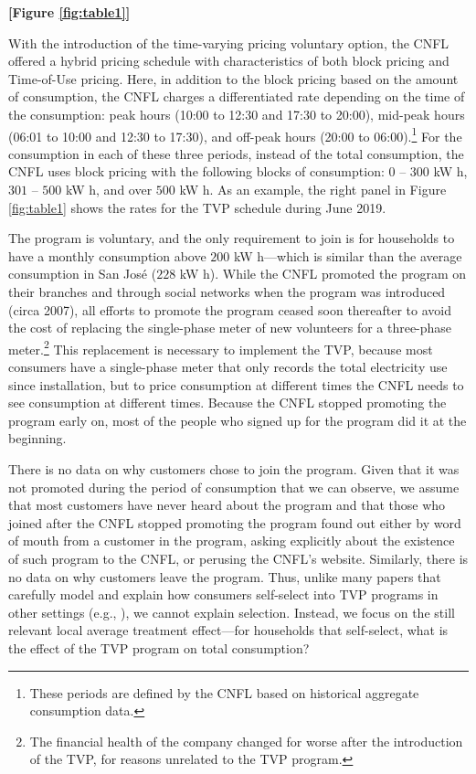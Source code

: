 \documentclass[12pt]{article}
\begin{document}
\centerline{\textbf{[Figure \ref{fig:table1}]}}


With the introduction of the time-varying pricing voluntary option, the CNFL offered a hybrid pricing schedule with characteristics of both block pricing and Time-of-Use pricing. Here, in addition to the block pricing based on the amount of consumption, the CNFL charges a differentiated rate depending on the time of the consumption: peak hours (10:00 to 12:30 and 17:30 to 20:00), mid-peak hours (06:01 to 10:00 and 12:30 to 17:30), and off-peak hours (20:00 to 06:00).\footnote{These periods are defined by the CNFL based on historical aggregate consumption data.} For the consumption in each of these three periods, instead of the total consumption, the CNFL uses block pricing with the following blocks of consumption: $0$ – $300$ kW h, $301$ – $500$ kW h, and over $500$ kW h. As an example, the right panel in Figure \ref{fig:table1} shows the rates for the TVP schedule during June 2019.

The program is voluntary, and the only requirement to join is for households to have a monthly consumption above $200$ kW h---which is similar than the average consumption in San José ($228$ kW h). While the CNFL promoted the program on their branches and through social networks when the program was introduced (circa 2007), all efforts to promote the program ceased soon thereafter to avoid the cost of replacing the single-phase meter of new volunteers for a three-phase meter.\footnote{The financial health of the company changed for worse after the introduction of the TVP, for reasons unrelated to the TVP program.} This replacement is necessary to implement the TVP, because most consumers have a single-phase meter that only records the total electricity use since installation, but to price consumption at different times the CNFL needs to see consumption at different times. Because the CNFL stopped promoting the program early on, most of the people who signed up for the program did it at the beginning.

There is no data on why customers chose to join the program. Given that it was not promoted during the period of consumption that we can observe, we assume that most customers have never heard about the program and that those who joined after the CNFL stopped promoting the program found out either by word of mouth from a customer in the program, asking explicitly about the existence of such program to the CNFL, or perusing the CNFL’s website. Similarly, there is no data on why customers leave the program. Thus, unlike many papers that carefully model and explain how consumers self-select into TVP programs in other settings (e.g., \cite{itoSelectionWelfareGains2021}), we cannot explain selection. Instead, we focus on the still relevant local average treatment effect---for households that self-select, what is the effect of the TVP program on total consumption?
\end{document}
